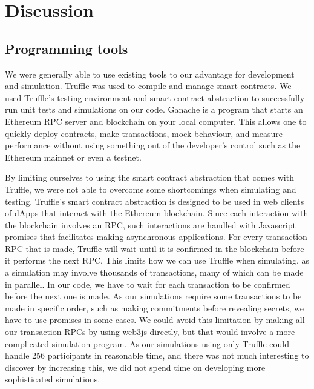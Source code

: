 \chapter{Discussion}
\label{chap:discussion}


\section{Programming tools}
\label{sec:tools}

We were generally able to use existing tools to our advantage for development and simulation. Truffle was used to compile and manage smart contracts. We used Truffle's testing environment and smart contract abstraction to successfully run unit tests and simulations on our code. Ganache is a program that starts an Ethereum RPC server and blockchain on your local computer. This allows one to quickly deploy contracts, make transactions, mock behaviour, and measure performance without using something out of the developer's control such as the Ethereum mainnet or even a testnet.

By limiting ourselves to using the smart contract abstraction that comes with Truffle, we were not able to overcome some shortcomings when simulating and testing. Truffle's smart contract abstraction is designed to be used in web clients of dApps that interact with the Ethereum blockchain. Since each interaction with the blockchain involves an RPC, such interactions are handled with Javascript promises that facilitates making asynchronous applications. For every transaction RPC that is made, Truffle will wait until it is confirmed in the blockchain before it performs the next RPC. This limits how we can use Truffle when simulating, as a simulation may involve thousands of transactions, many of which can be made in parallel. In our code, we have to wait for each transaction to be confirmed before the next one is made. As our simulations require some transactions to be made in specific order, such as making commitments before revealing secrets, we have to use promises in some cases. We could avoid this limitation by making all our transaction RPCs by using web3js directly, but that would involve a more complicated simulation program. As our simulations using only Truffle could handle 256 participants in reasonable time, and there was not much interesting to discover by increasing this, we did not spend time on developing more sophisticated simulations. 

